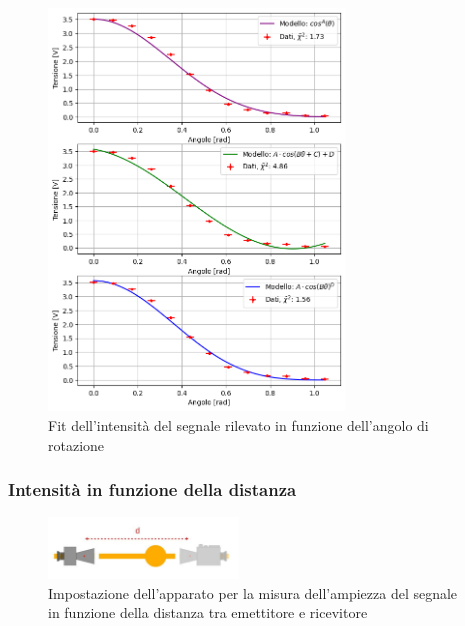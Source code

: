 \documentclass[letterpaper,12pt]{article}
\begin{document}
\begin{figure}[h!]
    \centering
    \includegraphics[width = 0.7\textwidth]{fit_rotazione.png}
    \caption{Fit dell'intensità del segnale rilevato in funzione dell'angolo di rotazione}
    \label{fig:fit_rotazione}
\end{figure}


\subsubsection{Intensità in funzione della distanza}

\begin{figure}[h!]
    \centering
    \includegraphics[width = 0.45\textwidth]{ampiezza distanza.jpg}
    \caption{Impostazione dell'apparato per la misura dell'ampiezza del segnale in funzione della distanza tra emettitore e ricevitore}
    \label{fig:ampiezza_distanza}
\end{figure}
\end{document}

